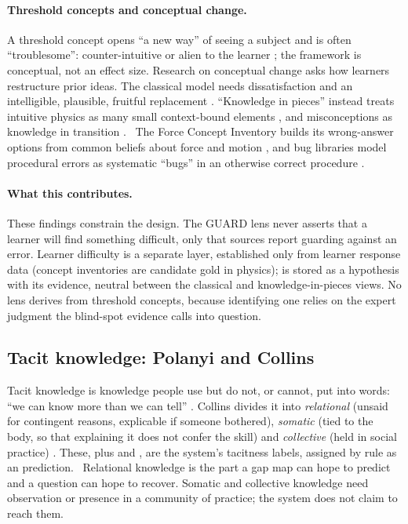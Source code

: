 \paragraph{Threshold concepts and conceptual change.} A threshold concept
opens ``a new way'' of seeing a subject and is often ``troublesome'':
counter-intuitive or alien to the learner
\parencite{meyer2003threshold,meyer2005threshold,meyer2006overcoming}; the
framework is conceptual, not an effect size. Research on conceptual change
asks how learners restructure prior ideas. The classical model needs
dissatisfaction and an intelligible, plausible, fruitful replacement
\parencite{posner1982accommodation}. ``Knowledge in pieces'' instead treats
intuitive physics as many small context-bound elements
\parencite{disessa1993toward}, and misconceptions as knowledge in transition
\parencite{smith1994misconceptions}. \evlit\ The Force Concept Inventory
builds its wrong-answer options from common beliefs about force and motion
\parencite{hestenes1992force}, and bug libraries model procedural errors as
systematic ``bugs'' in an otherwise correct procedure
\parencite{brown1978diagnostic}.

\paragraph{What this contributes.} These findings constrain the design. The
GUARD lens never asserts that a learner will find something difficult, only
that sources report guarding against an error. Learner difficulty is a
separate layer, established only from learner response data (concept
inventories are candidate gold in physics);  is stored as
a hypothesis with its evidence, neutral between the classical and
knowledge-in-pieces views. No lens derives from threshold concepts, because
identifying one relies on the expert judgment the blind-spot evidence calls
into question.

\subsection{Tacit knowledge: Polanyi and Collins}

Tacit knowledge is knowledge people use but do not, or cannot, put into
words: ``we can know more than we can tell'' \parencite{polanyi1966tacit}.
Collins divides it into \emph{relational} (unsaid for contingent reasons,
explicable if someone bothered), \emph{somatic} (tied to the body, so that
explaining it does not confer the skill) and \emph{collective} (held in
social practice) \parencite{collins2010tacit}. These, plus  and
, are the system's tacitness labels, assigned by rule as an
 prediction. \evint\ Relational knowledge is the part a gap map
can hope to predict and a question can hope to recover. Somatic and
collective knowledge need observation or presence in a community of
practice; the system does not claim to reach them.

